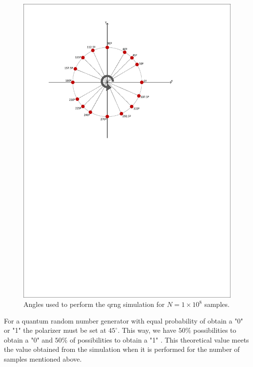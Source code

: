 \begin{figure}[h]
    \centering
        \includegraphics[clip, trim=0.5cm 15.5cm 2.5cm 1cm, width=1.00\textwidth]{./sdf/qrng/figures_raw/sphere.pdf}
    \caption{Angles used to perform the qrng simulation for $N=1 \times 10^{8}$ samples. }\label{sphere}
\end{figure}

For a quantum random number generator with equal probability of obtain a "0" \space or "1" \space the polarizer must be set at $45^{\circ}$. This way, we have $50\%$ possibilities to obtain a "0" \space and $50\%$ of possibilities to obtain a "1" \space. This theoretical value meets the value obtained from the simulation when it is performed for the number of samples mentioned above.


